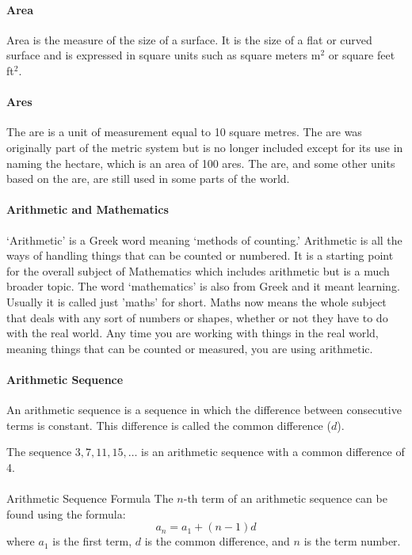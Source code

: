 \documentclass[12pt]{article}
\begin{document}
\paragraph{Area}
Area is the measure of the size of a surface. It is the size of a flat or curved surface and is expressed in square units such as square meters m$^2$ or square feet ft$^2$.

\paragraph{Ares}
The are is a unit of measurement equal to 10 square metres. The are was originally part of the metric system but is no longer included except for its use in naming the hectare, which is an area of 100 ares. The are, and some other units based on the are, are still used in some parts of the world.

\paragraph{Arithmetic and Mathematics}
‘Arithmetic’ is a Greek word meaning ‘methods of counting.’ Arithmetic is all the ways of handling things that can be counted or numbered. It is a starting point for the overall subject of Mathematics which includes arithmetic but is a much broader topic. The word ‘mathematics’ is also from Greek and it meant learning. Usually it is called just 'maths' for short. Maths now means the whole subject that deals with any sort of numbers or shapes, whether or not they have to do with the real world. Any time you are working with things in the real world, meaning things that can be counted or measured, you are using arithmetic.


\paragraph{Arithmetic Sequence}
An arithmetic sequence is a sequence in which the difference between consecutive terms is constant. This difference is called the common difference (\(d\)).

The sequence \(3, 7, 11, 15, \ldots\) is an arithmetic sequence with a common difference of 4.

\paragraph{}{Arithmetic Sequence Formula}
The \(n\)-th term of an arithmetic sequence can be found using the formula:
\[
a_n = a_1 + (n-1)d
\]
where \(a_1\) is the first term, \(d\) is the common difference, and \(n\) is the term number.
\end{document}
